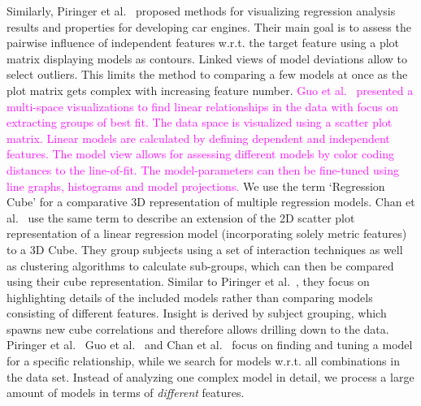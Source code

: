 \documentclass[journal]{style/vgtc} 			          %
\newcommand{\magenta}[1]{\textcolor{magenta}{#1}}
\begin{document}
Similarly, Piringer et al.~\cite{Piringer} proposed methods for visualizing regression analysis results and properties for developing car engines.
Their main goal is to assess the pairwise influence of independent features w.r.t. the target feature using a plot matrix displaying models as contours.
Linked views of model deviations allow to select outliers.
This limits the method to comparing a few models at once as the plot matrix gets complex with increasing feature number.
\magenta{
Guo et al.~\cite{Guo} presented a multi-space visualizations to find linear relationships in the data with focus on extracting groups of best fit.
The data space is visualized using a scatter plot matrix.
Linear models are calculated by defining dependent and independent features.
The model view allows for assessing different models by color coding distances to the line-of-fit.
The model-parameters can then be fine-tuned using line graphs, histograms and model projections.
}
We use the term `Regression Cube' for a comparative 3D representation of multiple regression models.
Chan et al.~\cite{Chan} use the same term to describe an extension of the 2D scatter plot representation of a linear regression model (incorporating solely metric features) to a 3D Cube.
They group subjects using a set of interaction techniques as well as clustering algorithms to calculate sub-groups, which can then be compared using their cube representation.
Similar to Piringer et al.~\cite{Piringer}, they focus on highlighting details of the included models rather than comparing models consisting of different features.
Insight is derived by subject grouping, which spawns new cube correlations and therefore allows drilling down to the data.
Piringer et al.~\cite{Piringer} Guo et al.~\cite{Guo} and Chan et al.~\cite{Chan} focus on finding and tuning a model for a specific relationship, while we search for models w.r.t. all combinations in the data set.
Instead of analyzing one complex model in detail, we process a large amount of models in terms of \emph{different} features.
\end{document}
